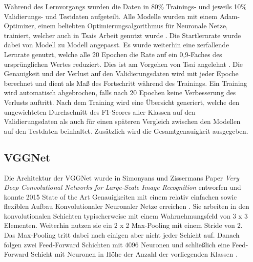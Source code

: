 \documentclass[twoside,a4paper]{IEEEtran}
\begin{document}
Während des Lernvorgangs wurden die Daten in 80\% Trainings- und jeweils 10\% Validierungs- und Testdaten aufgeteilt. Alle Modelle wurden mit einem Adam-Optimizer, einem beliebten Optimierungsalgorithmus für Neuronale Netze, trainiert, welcher auch in Tsais Arbeit genutzt wurde \cite[S.4]{RHC}. Die Startlernrate wurde dabei von Modell zu Modell angepasst. Es wurde weiterhin eine zerfallende Lernrate genutzt, welche alle 20 Epochen die Rate auf ein 0,9-Faches des ursprünglichen Wertes reduziert. Dies ist am Vorgehen von Tsai angelehnt \cite[S.4]{RHC}. Die Genauigkeit und der Verlust auf den Validierungsdaten wird mit jeder Epoche berechnet und dient als Maß des Fortschritt während des Trainings. Ein Training wird automatisch abgebrochen, falls nach 20 Epochen keine Verbesserung des Verlusts auftritt. Nach dem Training wird eine Übersicht generiert, welche den ungewichteten Durchschnitt des F1-Scores aller Klassen auf den Validierungsdaten als auch für einen späteren Vergleich zwischen den Modellen auf den Testdaten beinhaltet. Zusätzlich wird die Gesamtgenauigkeit ausgegeben.

\subsection{VGGNet}  %
Die Architektur der VGGNet wurde in Simonyans und Zissermans Paper \textit{Very Deep Convolutional Networks for Large-Scale Image Recognition} entworfen und konnte 2015 State of the Art Genauigkeiten mit einem relativ einfachen sowie flexiblen Aufbau Konvolutionaler Neuronaler Netze erreichen \cite[S.1]{simonyan2015deep}. Sie arbeiten in den konvolutionalen Schichten typischerweise mit einem Wahrnehmungsfeld von 3 x 3 Elementen. Weiterhin nutzen sie ein 2 x 2 Max-Pooling mit einem Stride von 2. Das Max-Pooling tritt dabei nach einigen aber nicht jeder Schicht auf. Danach folgen zwei Feed-Forward Schichten mit 4096 Neuronen und schließlich eine Feed-Forward Schicht mit Neuronen in Höhe der Anzahl der vorliegenden Klassen \cite[S.2]{simonyan2015deep}.
\end{document}
